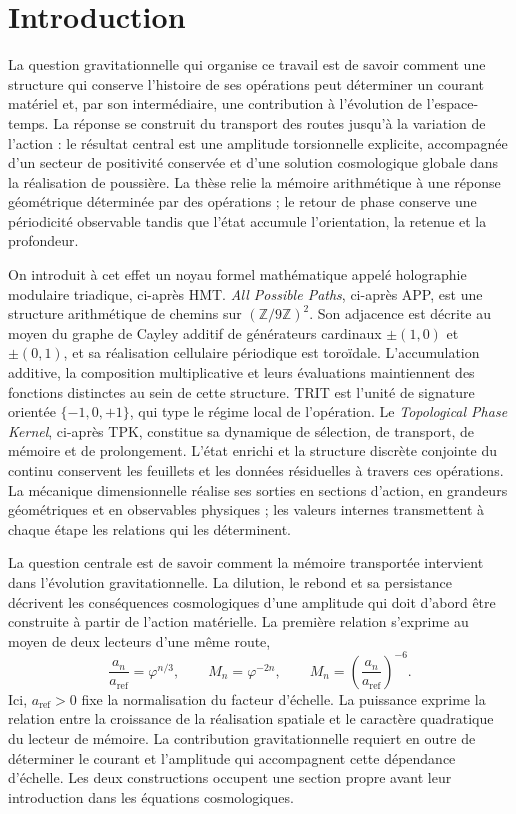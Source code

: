 \section{Introduction}
\label{vii:sec:introduccion}

La question gravitationnelle qui organise ce travail est de savoir comment une structure
qui conserve l'histoire de ses opérations peut déterminer un
courant matériel et, par son intermédiaire, une contribution à l'évolution de
l'espace-temps. La réponse se construit du transport des routes
jusqu'à la variation de l'action : le résultat central est une amplitude
torsionnelle explicite, accompagnée d'un secteur de positivité conservée et
d'une solution cosmologique globale dans la réalisation de poussière. La thèse
relie la mémoire arithmétique à une réponse géométrique déterminée par des
opérations ; le retour de phase conserve une périodicité observable
tandis que l'état accumule l'orientation, la retenue et la profondeur.

On introduit à cet effet un noyau formel mathématique appelé holographie modulaire triadique, ci-après HMT. \emph{All Possible Paths}, ci-après APP, est une structure arithmétique de chemins sur \((\mathbb Z/9\mathbb Z)^2\). Son adjacence est décrite au moyen du graphe de Cayley additif de générateurs cardinaux \(\pm(1,0)\) et \(\pm(0,1)\), et sa réalisation cellulaire périodique est toroïdale. L'accumulation additive, la composition multiplicative et leurs évaluations maintiennent des fonctions distinctes au sein de cette structure. TRIT est l'unité de signature orientée \(\{-1,0,+1\}\), qui type le régime local de l'opération. Le \emph{Topological Phase Kernel}, ci-après TPK, constitue sa dynamique de sélection, de transport, de mémoire et de prolongement. L'état enrichi et la structure discrète conjointe du continu conservent les feuillets et les données résiduelles à travers ces opérations. La mécanique dimensionnelle réalise ses sorties en sections d'action, en grandeurs géométriques et en observables physiques ; les valeurs internes transmettent à chaque étape les relations qui les déterminent.

La question centrale est de savoir comment la mémoire transportée intervient
dans l'évolution gravitationnelle. La dilution, le rebond et sa persistance
décrivent les conséquences cosmologiques d'une amplitude qui doit d'abord
être construite à partir de l'action matérielle. La première relation s'exprime
au moyen de deux lecteurs d'une même route,
\begin{equation}
 \frac{a_n}{a_{\mathrm{ref}}}=\varphi^{n/3},
 \qquad M_n=\varphi^{-2n},
 \qquad
 M_n=\left(\frac{a_n}{a_{\mathrm{ref}}}\right)^{-6}.
 \label{vii:eq:programa-dilucion}
\end{equation}
Ici, \(a_{\mathrm{ref}}>0\) fixe la normalisation du facteur d'échelle.
La puissance exprime la relation entre la croissance de la réalisation
spatiale et le caractère quadratique du lecteur de mémoire. La contribution
gravitationnelle requiert en outre de déterminer le courant et l'amplitude qui
accompagnent cette dépendance d'échelle. Les deux constructions occupent une
section propre avant leur introduction dans les équations cosmologiques.


